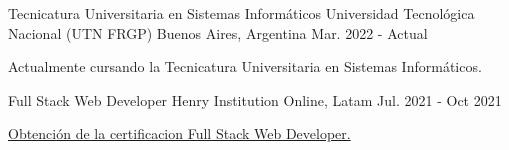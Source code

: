 

\begin{cventries}

  \cventry
    {Tecnicatura Universitaria en Sistemas Informáticos} %
    {Universidad Tecnológica Nacional (UTN FRGP)} %
    {Buenos Aires, Argentina} %
    {Mar. 2022 - Actual} %
    {
      \begin{cvitems} %
        \item {Actualmente cursando la Tecnicatura Universitaria en Sistemas Informáticos.}
      \end{cvitems}
    }

  \cventry
    {Full Stack Web Developer} %
    {Henry Institution} %
    {Online, Latam} %
    {Jul. 2021 - Oct 2021} %
    {
      \begin{cvitems} %
        \item {\href{https://certificates.soyhenry.com/cert?id=970c6032-7d99-4536-90b3-e421ec1036d5}{Obtención de la certificacion Full Stack Web Developer.}}
      \end{cvitems}
    }

\end{cventries}
